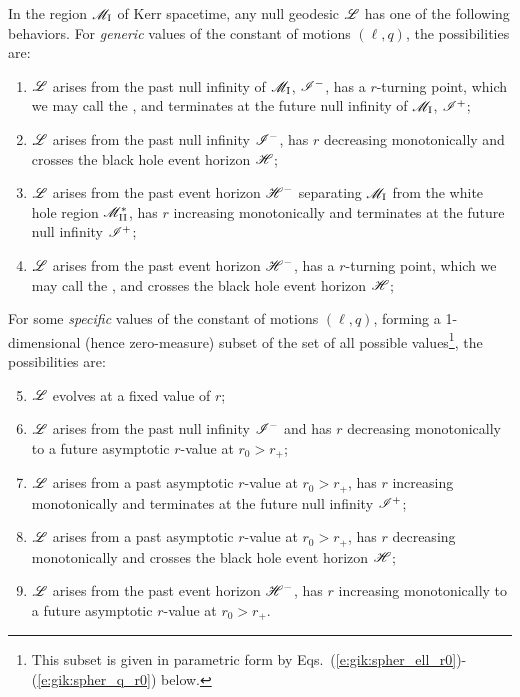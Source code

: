 \begin{prop}
In the region $\mathscr{M}_{\rm I}$ of Kerr spacetime,
any null geodesic $\mathscr{L}$ has one of the following behaviors.
For \emph{generic} values of the constant of motions $(\ell, q)$, the possibilities are:
\begin{enumerate}
\item $\mathscr{L}$ arises from the past null infinity of $\mathscr{M}_{\rm I}$, $\mathscr{I}^-$, has a $r$-turning point,
which we may call the , and terminates at the future null infinity
of $\mathscr{M}_{\rm I}$, $\mathscr{I}^+$;
\item $\mathscr{L}$ arises from the past null infinity $\mathscr{I}^-$, has $r$ decreasing
monotonically and crosses the black hole event horizon $\mathscr{H}$;
\item $\mathscr{L}$ arises from the past event horizon $\mathscr{H}^-$ separating $\mathscr{M}_{\rm I}$
from the white hole region $\mathscr{M}_{\rm II}^*$, has $r$ increasing monotonically and
terminates at the future null infinity $\mathscr{I}^+$;
\item $\mathscr{L}$ arises from the past event horizon $\mathscr{H}^-$, has a $r$-turning point,
which we may call the , and crosses the black hole event horizon $\mathscr{H}$;
\end{enumerate}
For some \emph{specific} values of the constant of motions $(\ell, q)$,
forming a 1-dimensional (hence zero-measure) subset of the set of all possible values\footnote{This
subset is given in parametric form by Eqs.~(\ref{e:gik:spher_ell_r0})-(\ref{e:gik:spher_q_r0}) below.},
the possibilities are:
\begin{enumerate}
\setcounter{enumi}{4}
\item $\mathscr{L}$ evolves at a fixed value of $r$;
\item $\mathscr{L}$ arises from the past null infinity $\mathscr{I}^-$
and has $r$ decreasing monotonically to
a future asymptotic $r$-value at $r_0 > r_+$;
\item $\mathscr{L}$ arises from a past asymptotic $r$-value at $r_0 > r_+$, has
$r$ increasing monotonically and terminates at the future null infinity
$\mathscr{I}^+$;
\item $\mathscr{L}$ arises from a past asymptotic $r$-value at $r_0 > r_+$, has
$r$ decreasing monotonically and crosses the black hole event horizon $\mathscr{H}$;
\item $\mathscr{L}$ arises from the past event horizon $\mathscr{H}^-$, has
$r$ increasing monotonically to
a future asymptotic $r$-value at $r_0 > r_+$.
\end{enumerate}
\end{prop}



